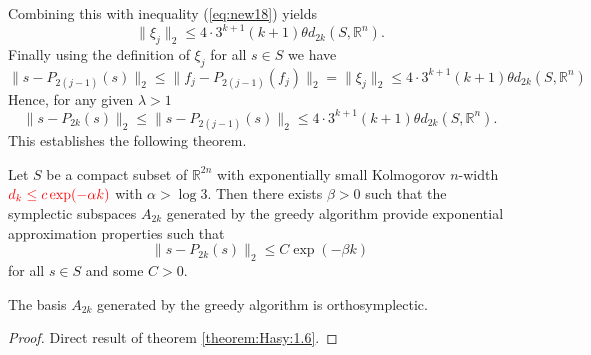 Combining this with inequality (\ref{eq:new18}) yields
\begin{equation} \label{eq:new20}
	\| \xi_j \|_2 \leq 4\cdot 3^{k+1} (k+1) \theta d_{2k}(S,\mathbb R^n).
\end{equation}
Finally using the definition of $\xi_j$ for all $s\in S$ we have
\begin{equation} \label{eq:new21}
	\| s - P_{2(j-1)}(s) \|_2 \leq \| f_j - P_{2(j-1)}(f_j) \|_2 = \|\xi_j \|_2 \leq 4\cdot 3^{k+1} (k+1) \theta d_{2k}(S,\mathbb R^n)
\end{equation}
Hence, for any given $\lambda > 1$
\begin{equation} \label{eq:new22}
	\| s - P_{2k}(s) \|_2 \leq \| s - P_{2(j-1)}(s) \|_2 \leq 4\cdot 3^{k+1} (k+1) \theta d_{2k}(S,\mathbb R^n).
\end{equation}
This establishes the following theorem.
\begin{theorem} \label{theorem:SyMo:2}
	Let $S$ be a compact subset of $\mathbb{R}^{2n}$ with exponentially small Kolmogorov $n$-width $\color{red} d_{k}\leq c\exp(-\alpha k)$ with $\alpha > \log3$. Then there exists $\beta>0$ such that the symplectic subspaces $A_{2k}$ generated by the greedy algorithm provide exponential approximation properties such that
\begin{equation} \label{eq:new23}
	\| s - P_{2k}(s) \|_2 \leq C \exp(-\beta k)
\end{equation}
for all $s\in S$ and some $C>0$.
\end{theorem}

{\edit
\begin{theorem} \label{theorem:SyMo:3}
	The basis $A_{2k}$ generated by the greedy algorithm is orthosymplectic.
\end{theorem}
\begin{proof}
	Direct result of theorem \ref{theorem:Hasy:1.6}.
\end{proof}
}

